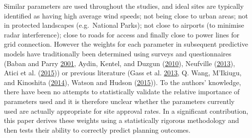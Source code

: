 \documentclass[a4paper,]{article}
\theoremstyle{definition}
\theoremstyle{definition}
\theoremstyle{remark}
\begin{document}
{Similar parameters are used throughout the studies, and ideal sites are
typically identified as having high average wind speeds; not being close
to urban areas; not in protected landscapes (e.g.~National Parks); not
close to airports (to minimise radar interference); close to roads for
access and finally close to power lines for grid connection. However the
weights for each parameter in subsequent predictive models have
traditionally been determined using surveys and questionnaires (Baban
and Parry \protect\hyperlink{ref-Baban2001}{2001}, Aydin, Kentel, and
Duzgun (\protect\hyperlink{ref-Aydin2010}{2010}), Neufville
(\protect\hyperlink{ref-Neufville2013}{2013}), Atici et al.
(\protect\hyperlink{ref-Atici2015}{2015})) or previous literature (Gass
et al. \protect\hyperlink{ref-Gass2013}{2013}, Q. Wang, M'Ikiugu, and
Kinoshita (\protect\hyperlink{ref-Wang2014}{2014}), Watson and Hudson
(\protect\hyperlink{ref-Watson2015}{2015})). To the authors' knowledge,
there have been no attempts to statistically validate the relative
importance of parameters used and it is therefore unclear whether the
parameters currently used are actually appropriate for site approval
rates. In a significant contribution, this paper derives these weights
using a statistically rigorous methodology and then tests their ability
to correctly predict planning outcomes.

}
\end{document}
